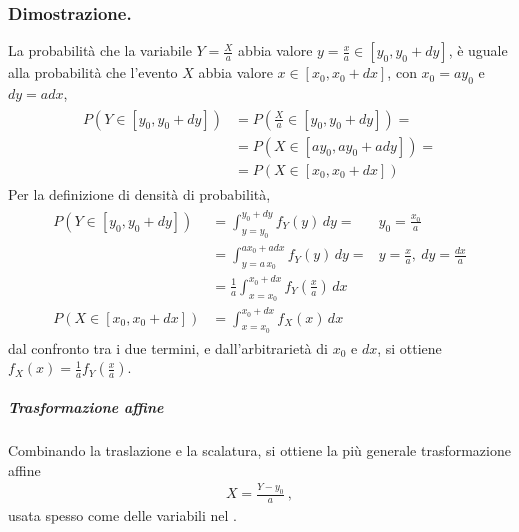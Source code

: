 \documentclass[letterpaper,10pt,italian]{jupyterBook}
\begin{document}
\subsubsection*{Dimostrazione.}

\sphinxAtStartPar
La probabilità che la variabile \(Y = \frac{X}{a}\) abbia valore \(y = \frac{x}{a} \in [ y_0, y_0 + dy ]\), è uguale alla probabilità che l’evento \(X\) abbia valore \(x \in [x_0, x_0 + dx]\), con \(x_0 = a y_0\) e \(dy = a dx\),
\begin{equation*}
\begin{split}\begin{aligned}
  P(Y \in [y_0, y_0 + dy]) & = P\left( \frac{X}{a} \in [y_0, y_0 + dy]\right) = \\
  & = P(X \in [a y_0, a y_0 + a dy]) = \\
  & = P(X \in [x_0, x_0 + dx])
\end{aligned}\end{split}
\end{equation*}
\sphinxAtStartPar
Per la definizione di densità di probabilità,
\begin{equation*}
\begin{split}\begin{aligned}
  P(Y \in [y_0, y_0 + dy]) & = \int_{y=y_0}^{y_0 + dy} f_Y(y) \, dy =  & y_0 = \frac{x_0}{a} \\
  & = \int_{y=a \, x_0}^{a x_0 + a dx} f_Y(y) \, dy = & y = \frac{x}{a}, \ dy = \frac{dx}{a} \\
  & = \frac{1}{a} \int_{x=x_0}^{x_0+dx} f_Y\left( \frac{x}{a} \right) \, dx \\
  P(X \in [x_0, x_0 + dx]) & = \int_{x=x_0}^{x_0+dx} f_X(x) \, dx
\end{aligned}\end{split}
\end{equation*}
\sphinxAtStartPar
dal confronto tra i due termini, e dall’arbitrarietà di \(x_0\) e \(dx\), si ottiene \(f_{X}(x) = \frac{1}{a} f_Y\left(\frac{x}{a}\right)\).


\subparagraph{Trasformazione affine}
\label{\detokenize{ch/statistics/rv_pdf_transformations:trasformazione-affine}}
\sphinxAtStartPar
Combinando la traslazione e la scalatura, si ottiene la più generale trasformazione affine
\begin{equation*}
\begin{split}X = \frac{Y - y_0}{a} \ ,\end{split}
\end{equation*}
\sphinxAtStartPar
usata spesso come  delle variabili nel .   \sphinxstylestrong{(!!!)}
\end{document}
